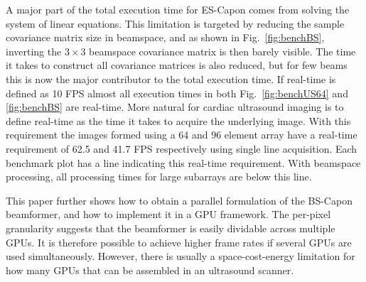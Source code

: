 \documentclass[journal]{IEEEtran}
\newcommand\multimedia[1]{\textbf{{\color{red}#1}}}
\begin{document}
A major part of the total execution time for ES-Capon comes from solving the system of linear equations. This limitation is targeted by reducing the sample covariance matrix size in beamspace, and as shown in Fig.\ \ref{fig:benchBS}, inverting the $3\times3$ beamspace covariance matrix is then barely visible. The time it takes to construct all covariance matrices is also reduced, but for few beams this is now the major contributor to the total execution time. If real-time is defined as 10 FPS \cite{Chen2011} almost all execution times in both Fig.\ \ref{fig:benchUS64} and \ref{fig:benchBS} are real-time. More natural for cardiac ultrasound imaging is to define real-time as the time it takes to acquire the underlying image. With this requirement the images formed using a 64 and 96 element array have a real-time requirement of 62.5 and 41.7 FPS respectively using single line acquisition. Each benchmark plot has a line indicating this real-time requirement. With beamspace processing, all processing times for large subarrays are below this line.

This paper further shows how to obtain a parallel formulation of the BS-Capon beamformer, and how to implement it in a GPU framework. The per-pixel granularity suggests that the beamformer is easily dividable across multiple GPUs. It is therefore possible to achieve higher frame rates if several GPUs are used simultaneously. However, there is usually a space-cost-energy limitation for how many GPUs that can be assembled in an ultrasound scanner.
 
\end{document}
